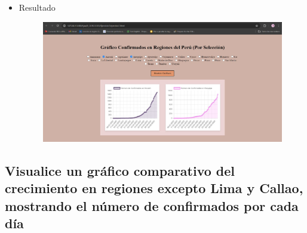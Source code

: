 \documentclass{article}
\begin{document}
\begin{itemize}
\begin{figure}[H]
		\end{figure}
		\item Resultado
		\begin{figure}[H]
			\centering
			\includegraphics[width=1.0\textwidth,keepaspectratio]{img/Ejer7T2Result.jpg}
		\end{figure}
	\end{itemize}
	
	\subsection{Visualice un gráfico comparativo del crecimiento en regiones excepto Lima y Callao, mostrando el número de confirmados por cada día}
	
\end{document}
